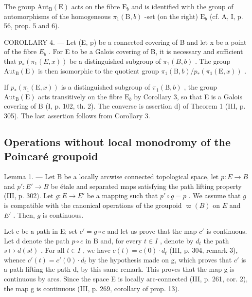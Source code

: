 The group \(\mathrm{Aut}_{\mathrm{B}}(\mathrm{E})\) acts on the fibre \(\mathrm{E}_b\) and is identified with the group of automorphisms of the homogeneous \(\pi_1(\mathrm{B},b)\) -set (on the right) \(\mathrm{E}_b\) (cf. A, I, p. 56, prop. 5 and 6).

COROLLARY 4. --- Let (E, p) be a connected covering of B and let x be a point of the fibre \(E_{b}\) . For E to be a Galois covering of B, it is necessary and sufficient that \(p_{*}(\pi_{1}(E, x))\) be a distinguished subgroup of \(\pi_{1}(B, b)\) . The group \(\mathrm{Aut}_{\mathrm{B}}(\mathrm{E})\) is then isomorphic to the quotient group \(\pi_{1}(\mathrm{B}, b)/p_{*}(\pi_{1}(\mathrm{E}, x))\) .

If \(p_{*}(\pi_{1}(\mathrm{E},x))\) is a distinguished subgroup of \(\pi_1(\mathrm{B},b)\) , the group \(\mathrm{Aut}_{\mathrm{B}}(\mathrm{E})\) acts transitively on the fibre \(\mathrm{E}_b\) by Corollary 3, so that E is a Galois covering of B (I, p. 102, th. 2). The converse is assertion d) of Theorem 1 (III, p. 305). The last assertion follows from Corollary 3.

\subsection{Operations without local monodromy of the Poincaré groupoid}

Lemma 1. --- Let B be a locally arcwise connected topological space, let \(p \colon E \to B\) and \(p' \colon E' \to B\) be étale and separated maps satisfying the path lifting property (III, p. 302). Let \(g \colon E \to E'\) be a mapping such that \(p' \circ g = p\) . We assume that \(g\) is compatible with the canonical operations of the groupoid \(\varpi(B)\) on \(E\) and \(E'\) . Then, \(g\) is continuous.

Let c be a path in E; set \(c' = g \circ c\) and let us prove that the map \(c'\) is continuous. Let d denote the path \(p \circ c\) in B and, for every \(t \in I\) , denote by \(d_t\) the path \(s \mapsto d(st)\) . For all \(t \in I\) , we have \(c(t) = c(0) \cdot d_t\) (III, p. 304, remark 3), whence \(c'(t) = c'(0) \cdot d_t\) by the hypothesis made on g, which proves that \(c'\) is a path lifting the path d, by this same remark. This proves that the map g is continuous by arcs. Since the space E is locally arc-connected (III, p. 261, cor. 2), the map g is continuous (III, p. 269, corollary of prop. 13).

